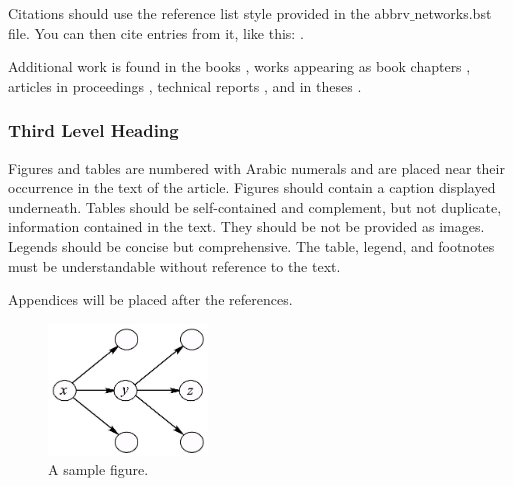 \documentclass[num-refs]{wiley-networks}
\begin{document}
Citations should use the reference list style provided in the  abbrv$\_$networks.bst file. You can then cite entries from it, like this: \cite{Adams}. 


Additional work is found in the books \cite{AhujaEtal, vonNeumann}, works appearing as book chapters \cite{ReadTutte, Shapiro}, articles in proceedings \cite{Goemans, Seibert}, technical reports \cite{Jones}, and in theses \cite{Ponza, Wilson}.





\subsubsection{Third Level Heading}
Figures and tables are numbered with Arabic numerals and are placed near their occurrence in the text of the article. 
Figures should contain a caption displayed underneath.
Tables should be self-contained and complement, but not duplicate, information contained in the text. They should be not be provided as images. Legends should be concise but comprehensive. The table, legend, and footnotes must be understandable without reference to the text.

Appendices will be placed after the references. 

\begin{figure}[h!]
\centering
\includegraphics[width=120pt]{figure2aa}
\caption{A sample figure.}
\end{figure}
\end{document}
